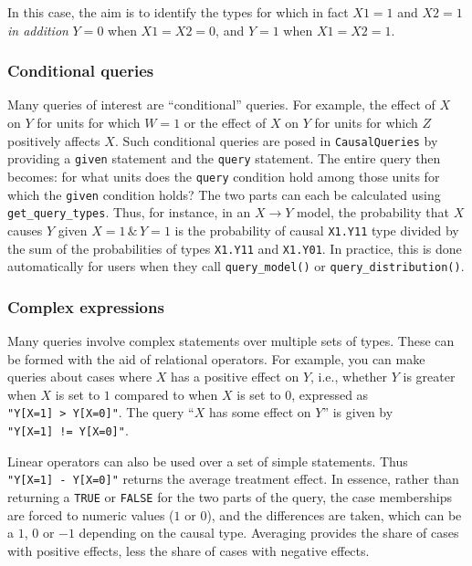 \documentclass[
  11pt,
  article]{jss}
\begin{document}
In this case, the aim is to identify the types for which in fact
\(X1=1\) and \(X2=1\) \emph{in addition} \(Y=0\) when \(X1 = X2 = 0\),
and \(Y = 1\) when \(X1 = X2 = 1\).

\subsubsection{Conditional queries}\label{conditional-queries}

Many queries of interest are ``conditional'' queries. For example, the
effect of \(X\) on \(Y\) for units for which \(W= 1\) or the effect of
\(X\) on \(Y\) for units for which \(Z\) positively affects \(X\). Such
conditional queries are posed in \texttt{CausalQueries} by providing a
\texttt{given} statement and the \texttt{query} statement. The entire
query then becomes: for what units does the \texttt{query} condition
hold among those units for which the \texttt{given} condition holds? The
two parts can each be calculated using \texttt{get\_query\_types}. Thus,
for instance, in an \(X \rightarrow Y\) model, the probability that
\(X\) causes \(Y\) given \(X=1 \, \& \, Y=1\) is the probability of
causal \texttt{X1.Y11} type divided by the sum of the probabilities of
types \texttt{X1.Y11} and \texttt{X1.Y01}. In practice, this is done
automatically for users when they call \texttt{query\_model()} or
\texttt{query\_distribution()}.

\subsubsection{Complex expressions}\label{complex-expressions}

Many queries involve complex statements over multiple sets of types.
These can be formed with the aid of relational operators. For example,
you can make queries about cases where \(X\) has a positive effect on
\(Y\), i.e., whether \(Y\) is greater when \(X\) is set to \(1\)
compared to when \(X\) is set to \(0\), expressed as
\texttt{"Y{[}X=1{]}\ \textgreater{}\ Y{[}X=0{]}"}. The query ``\(X\) has
some effect on \(Y\)'' is given by
\texttt{"Y{[}X=1{]}\ !=\ Y{[}X=0{]}"}.

Linear operators can also be used over a set of simple statements. Thus
\texttt{"Y{[}X=1{]}\ -\ Y{[}X=0{]}"} returns the average treatment
effect. In essence, rather than returning a \texttt{TRUE} or
\texttt{FALSE} for the two parts of the query, the case memberships are
forced to numeric values (\(1\) or \(0\)), and the differences are
taken, which can be a \(1\), \(0\) or \(-1\) depending on the causal
type. Averaging provides the share of cases with positive effects, less
the share of cases with negative effects.
\end{document}
